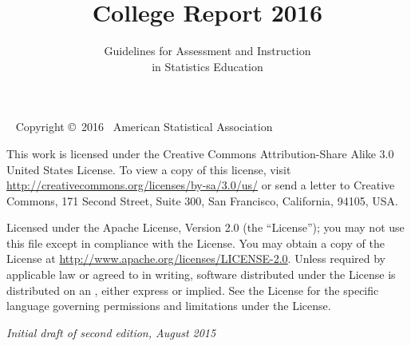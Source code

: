 \documentclass[twoside,openany]{tufte-book}
\title[GAISE College Report 2016]{College Report 2016}
\author[Guidelines for Assessment and Instruction in Statistics Education]{Guidelines for Assessment and Instruction\\ \noindent in Statistics Education}
\begin{document}
\frontmatter




\maketitle


\newpage
\begin{fullwidth}
~\vfill
\thispagestyle{empty}
\setlength{\parindent}{0pt}
\setlength{\parskip}{\baselineskip}
Copyright \copyright\ 2016~ American Statistical Association

\par{}

\par This work is licensed under the Creative Commons Attribution-Share Alike 3.0 United States License. To view a copy of this license, visit \url{http://creativecommons.org/licenses/by-sa/3.0/us/} or send a letter to Creative Commons, 171 Second Street, Suite 300, San Francisco, California, 94105, USA. 

\par{}

\par Licensed under the Apache License, Version 2.0 (the ``License''); you may not
use this file except in compliance with the License. You may obtain a copy
of the License at \url{http://www.apache.org/licenses/LICENSE-2.0}. Unless
required by applicable law or agreed to in writing, software distributed
under the License is distributed on an , either express or implied. See the
License for the specific language governing permissions and limitations
under the License.

\par\textit{Initial draft of second edition, August 2015}
\end{fullwidth}

\tableofcontents






















\backmatter




\printindex
\end{document}
